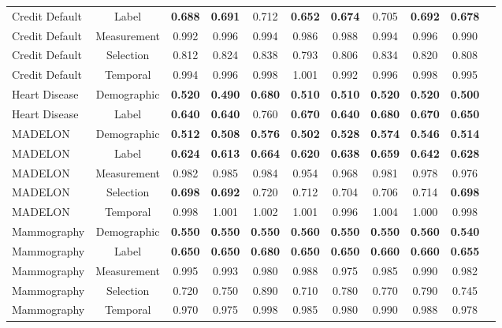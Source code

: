 \documentclass[conference]{IEEEtran}
\begin{document}
\begin{table}[t]
\begin{tabular}{lcccccccccc}
        Credit Default & Label & \textbf{0.688} & \textbf{0.691} & 0.712 & \textbf{0.652} & \textbf{0.674} & 0.705 & \textbf{0.692} & \textbf{0.678} \\
        Credit Default & Measurement & 0.992 & 0.996 & 0.994 & 0.986 & 0.988 & 0.994 & 0.996 & 0.990 \\
        Credit Default & Selection & 0.812 & 0.824 & 0.838 & 0.793 & 0.806 & 0.834 & 0.820 & 0.808 \\
        Credit Default & Temporal & 0.994 & 0.996 & 0.998 & 1.001 & 0.992 & 0.996 & 0.998 & 0.995 \\
        \midrule
        Heart Disease & Demographic & \textbf{0.520} & \textbf{0.490} & \textbf{0.680} & \textbf{0.510} & \textbf{0.510} & \textbf{0.520} & \textbf{0.520} & \textbf{0.500} \\
        Heart Disease & Label & \textbf{0.640} & \textbf{0.640} & 0.760 & \textbf{0.670} & \textbf{0.640} & \textbf{0.680} & \textbf{0.670} & \textbf{0.650} \\
        \midrule
        MADELON & Demographic & \textbf{0.512} & \textbf{0.508} & \textbf{0.576} & \textbf{0.502} & \textbf{0.528} & \textbf{0.574} & \textbf{0.546} & \textbf{0.514} \\
        MADELON & Label & \textbf{0.624} & \textbf{0.613} & \textbf{0.664} & \textbf{0.620} & \textbf{0.638} & \textbf{0.659} & \textbf{0.642} & \textbf{0.628} \\
        MADELON & Measurement & 0.982 & 0.985 & 0.984 & 0.954 & 0.968 & 0.981 & 0.978 & 0.976 \\
        MADELON & Selection & \textbf{0.698} & \textbf{0.692} & 0.720 & 0.712 & 0.704 & 0.706 & 0.714 & \textbf{0.698} \\
        MADELON & Temporal & 0.998 & 1.001 & 1.002 & 1.001 & 0.996 & 1.004 & 1.000 & 0.998 \\
        \midrule
        Mammography & Demographic & \textbf{0.550} & \textbf{0.550} & \textbf{0.550} & \textbf{0.560} & \textbf{0.550} & \textbf{0.550} & \textbf{0.560} & \textbf{0.540} \\
        Mammography & Label & \textbf{0.650} & \textbf{0.650} & \textbf{0.680} & \textbf{0.650} & \textbf{0.650} & \textbf{0.660} & \textbf{0.660} & \textbf{0.655} \\
        Mammography & Measurement & 0.995 & 0.993 & 0.980 & 0.988 & 0.975 & 0.985 & 0.990 & 0.982 \\
        Mammography & Selection & 0.720 & 0.750 & 0.890 & 0.710 & 0.780 & 0.770 & 0.790 & 0.745 \\
        Mammography & Temporal & 0.970 & 0.975 & 0.998 & 0.985 & 0.980 & 0.990 & 0.988 & 0.978 \\
        \bottomrule
    \end{tabular}
\end{table}
\end{document}
